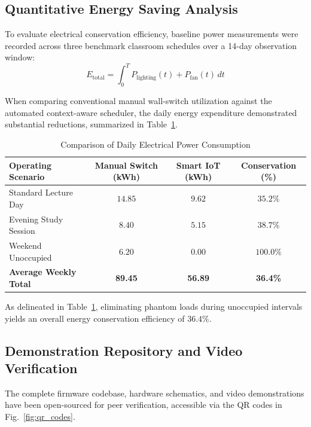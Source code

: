 \documentclass[conference]{IEEEtran}
\begin{document}
\subsection{Quantitative Energy Saving Analysis}
To evaluate electrical conservation efficiency, baseline power measurements were recorded across three benchmark classroom schedules over a 14-day observation window:
\begin{equation}
    E_{\text{total}} = \int_{0}^{T} P_{\text{lighting}}(t) + P_{\text{fan}}(t) \, dt
\end{equation}

When comparing conventional manual wall-switch utilization against the automated context-aware scheduler, the daily energy expenditure demonstrated substantial reductions, summarized in Table~\ref{tab:energy_comparison}.

\begin{table}[htbp]
\centering
\caption{Comparison of Daily Electrical Power Consumption}
\label{tab:energy_comparison}
\begin{tabular}{@{}lccc@{}}
\toprule
\textbf{Operating Scenario} & \textbf{Manual Switch (kWh)} & \textbf{Smart IoT (kWh)} & \textbf{Conservation (\%)} \\
\midrule
Standard Lecture Day & $14.85$ & $9.62$ & $35.2\%$ \\
Evening Study Session & $8.40$ & $5.15$ & $38.7\%$ \\
Weekend Unoccupied & $6.20$ & $0.00$ & $100.0\%$ \\
\midrule
\textbf{Average Weekly Total} & \textbf{89.45} & \textbf{56.89} & \textbf{36.4\%} \\
\bottomrule
\end{tabular}
\end{table}

As delineated in Table~\ref{tab:energy_comparison}, eliminating phantom loads during unoccupied intervals yields an overall energy conservation efficiency of $36.4\%$.

\subsection{Demonstration Repository and Video Verification}
The complete firmware codebase, hardware schematics, and video demonstrations have been open-sourced for peer verification, accessible via the QR codes in Fig.~\ref{fig:qr_codes}.
\end{document}
